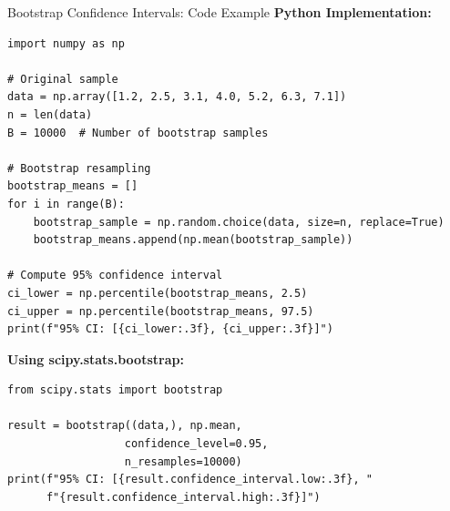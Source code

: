 \documentclass[aspectratio=169]{beamer}
\begin{document}
\begin{frame}[fragile]{Bootstrap Confidence Intervals: Code Example}
\scriptsize
\textbf{Python Implementation:}
\begin{lstlisting}[basicstyle=\tiny]
import numpy as np

# Original sample
data = np.array([1.2, 2.5, 3.1, 4.0, 5.2, 6.3, 7.1])
n = len(data)
B = 10000  # Number of bootstrap samples

# Bootstrap resampling
bootstrap_means = []
for i in range(B):
    bootstrap_sample = np.random.choice(data, size=n, replace=True)
    bootstrap_means.append(np.mean(bootstrap_sample))

# Compute 95% confidence interval
ci_lower = np.percentile(bootstrap_means, 2.5)
ci_upper = np.percentile(bootstrap_means, 97.5)
print(f"95% CI: [{ci_lower:.3f}, {ci_upper:.3f}]")
\end{lstlisting}

\vspace{0.03cm}
\textbf{Using scipy.stats.bootstrap:}
\begin{lstlisting}[basicstyle=\tiny]
from scipy.stats import bootstrap

result = bootstrap((data,), np.mean, 
                  confidence_level=0.95, 
                  n_resamples=10000)
print(f"95% CI: [{result.confidence_interval.low:.3f}, "
      f"{result.confidence_interval.high:.3f}]")
\end{lstlisting}
\end{frame}
\end{document}
